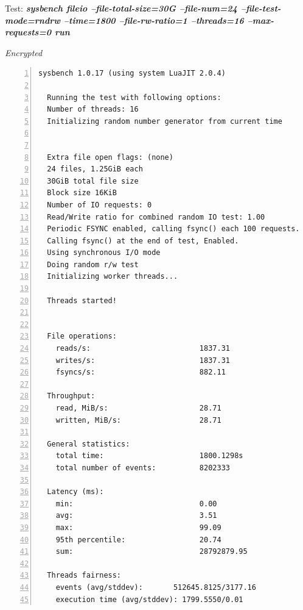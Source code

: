 \newpage
\begin{center}
  Test: \textbf{\textit{sysbench fileio --file-total-size=30G --file-num=24 --file-test-mode=rndrw --time=1800 --file-rw-ratio=1 --threads=16 --max-requests=0 run}}  
\end{center}
\vspace*{-\baselineskip}
\noindent\begin{minipage}[t]{0.45\linewidth}
  \centering
  \textit{Encrypted}
  \begin{lstlisting}[basicstyle=\tiny,frame=single, numbers=left, label=cpu_test1]
  sysbench 1.0.17 (using system LuaJIT 2.0.4)

  Running the test with following options:
  Number of threads: 16
  Initializing random number generator from current time
  
  
  Extra file open flags: (none)
  24 files, 1.25GiB each
  30GiB total file size
  Block size 16KiB
  Number of IO requests: 0
  Read/Write ratio for combined random IO test: 1.00
  Periodic FSYNC enabled, calling fsync() each 100 requests.
  Calling fsync() at the end of test, Enabled.
  Using synchronous I/O mode
  Doing random r/w test
  Initializing worker threads...
  
  Threads started!
  
  
  File operations:
    reads/s:                         1837.31
    writes/s:                        1837.31
    fsyncs/s:                        882.11
  
  Throughput:
    read, MiB/s:                     28.71
    written, MiB/s:                  28.71
  
  General statistics:
    total time:                      1800.1298s
    total number of events:          8202333
  
  Latency (ms):
    min:                             0.00
    avg:                             3.51
    max:                             99.09
    95th percentile:                 20.74
    sum:                             28792879.95
  
  Threads fairness:
    events (avg/stddev):       512645.8125/3177.16
    execution time (avg/stddev): 1799.5550/0.01
  \end{lstlisting}
\end{minipage}
\hspace{0.5cm}
